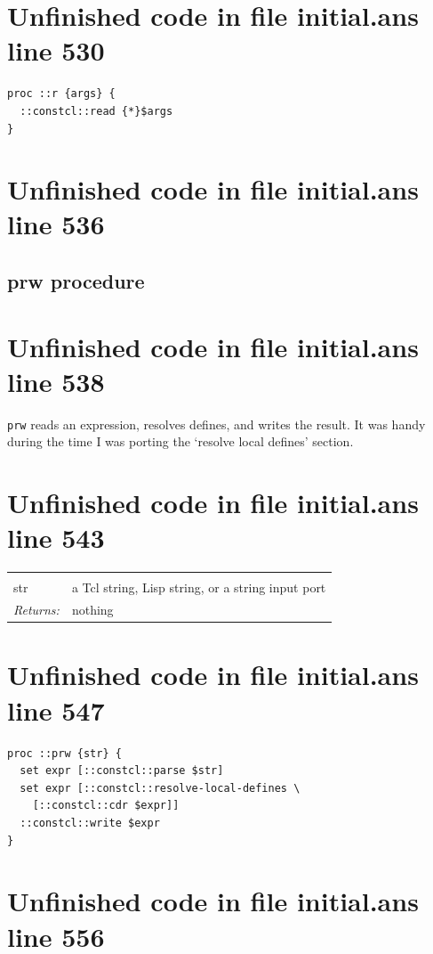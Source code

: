 \documentclass[twoside,9pt]{report}
\begin{document}
\section{Unfinished code in file initial.ans line 530}
\begin{lstlisting}
proc ::r {args} {
  ::constcl::read {*}$args
}
\end{lstlisting}
\section{Unfinished code in file initial.ans line 536}
\subsection{prw procedure}
\label{prw-procedure}
\section{Unfinished code in file initial.ans line 538}


\texttt{prw} reads an expression, resolves defines, and writes the result. It was handy during the time I was porting the `resolve local defines' section.

\section{Unfinished code in file initial.ans line 543}
\noindent\begin{tabular}{ |p{1.9cm} p{8cm}| }
\hline
\rowcolor[HTML]{CCCCCC} \multicolumn{2}{|l|}{\bf prw (internal)} \\
str & a Tcl string, Lisp string, or a string input port \\
\textit{Returns:} & nothing \\
\hline
\end{tabular}
\section{Unfinished code in file initial.ans line 547}
\begin{lstlisting}
proc ::prw {str} {
  set expr [::constcl::parse $str]
  set expr [::constcl::resolve-local-defines \
    [::constcl::cdr $expr]]
  ::constcl::write $expr
}
\end{lstlisting}
\section{Unfinished code in file initial.ans line 556}
\end{document}
